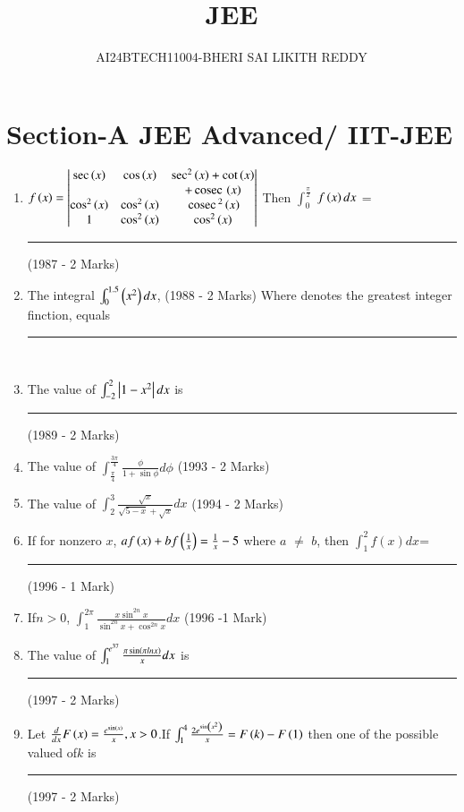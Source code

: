 \documentclass[journal,12pt,twocolumn]{IEEEtran}
\theoremstyle{remark}
\begin{document}


\title{JEE}
\author{AI24BTECH11004-BHERI SAI LIKITH REDDY}
\maketitle
\newpage
\bigskip

\renewcommand{\thefigure}{\theenumi}
\renewcommand{\thetable}{\theenumi}

\section{Section-A JEE Advanced/ IIT-JEE}
\begin{enumerate}
	\item
			$f\left(x\right) = \begin{vmatrix}
			\sec\left(x\right) & \cos\left(x\right) &\sec^2\left(x\right)+\cot\left(x\right)\\
			 & &+\,\text{cosec}\, \left(x\right)\\
		\cos^2\left(x\right) & \cos^2\left(x\right) & \,\text{cosec}\,^2\left(x\right)\\
	1 & \cos^2\left(x\right) & \cos^2\left(x\right)\end{vmatrix}$
	Then $\int_0^{\frac{\pi}{2}}$ $f\left(x\right)dx$ = \rule{1cm}{0.15mm}
\hfill{(1987 - 2 Marks)} 
		
\item The integral $\int_0^{1.5} \left(x^2\right)dx$,
\hfill{(1988 - 2 Marks)}
	Where \sbrak denotes the greatest integer finction, equals \rule{1cm}{0.15mm}  \\
		
\item The value of  $\int_{-2}^2 \left\vert1-x^2\right\vert dx$ is \rule{1cm}{0.15mm}
	\hfill{(1989 - 2 Marks)}
		
\item The value of $\int_{\frac{\pi}{4}}^{\frac{3\pi}{4}} \frac{\phi}{1+ \sin \phi} d\phi$
\hfill{(1993 - 2 Marks)}
		
\item The value of $\int_2^3 \frac{\sqrt x }{\sqrt {5-x}+\sqrt {x}} dx$
\hfill{(1994 - 2 Marks)}
		
\item If for nonzero $x$, $af\left(x\right)+bf \left(\frac{1}{x} \right) = \frac{1}{x}-5 $ where $a$ 
	$\neq$  $b$, then $\int_1^2f(x)dx$= \rule{1cm}{0.15mm}
\hfill{(1996 - 1 Mark)}
		
\item If$ n>0$, $\int_1^{2\pi} \frac {x \sin ^{2n}x}{\sin^{2n}x+\cos^{2n} x} dx $
\hfill{(1996 -1 Mark)}
		
\item The value of $\int_1^{e^{37}} \frac {\pi \sin \left(\pi lnx\right)}{x} dx$ is \rule{1cm}{0.15mm}

	\hfill{(1997 - 2 Marks)}
		
\item Let $\frac {d}{dx}F\left(x\right)=\frac {e^{\sin\left(x\right)}}{x},x>0$.If $\int_1^4 \frac{2e^{\sin \left(x^2\right)}}{x}=F\left(k\right)-F\left(1\right)$ then one of the possible valued of$ k$ is \rule{1cm}{0.15mm}
\hfill{(1997 - 2 Marks)}\\
\end{enumerate}
\end{document}

